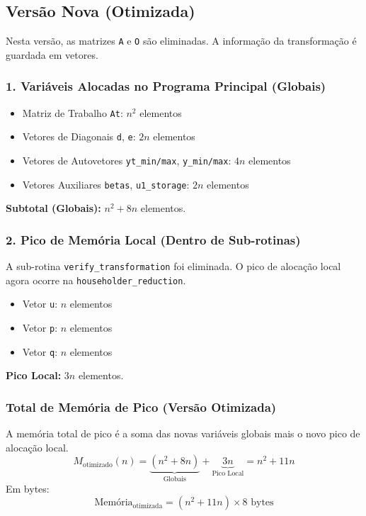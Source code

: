\documentclass[12pt, a4paper]{article} %
\begin{document}
            \subsection*{Vers\~ao Nova (Otimizada)}

            Nesta vers\~ao, as matrizes \texttt{A} e \texttt{O} s\~ao eliminadas. A informa\c{c}\~ao da transforma\c{c}\~ao \'e guardada em vetores.

            \subsubsection*{1. Vari\'aveis Alocadas no Programa Principal (Globais)}
            \begin{itemize}
                \item Matriz de Trabalho \texttt{At}: $n^2$ elementos
                \item Vetores de Diagonais \texttt{d}, \texttt{e}: $2n$ elementos
                \item Vetores de Autovetores \texttt{yt\_min/max}, \texttt{y\_min/max}: $4n$ elementos
                \item Vetores Auxiliares \texttt{betas}, \texttt{u1\_storage}: $2n$ elementos
            \end{itemize}
            \textbf{Subtotal (Globais):} $n^2 + 8n$ elementos.

            \subsubsection*{2. Pico de Mem\'oria Local (Dentro de Sub-rotinas)}
            A sub-rotina \texttt{verify\_transformation} foi eliminada. O pico de aloca\c{c}\~ao local agora ocorre na \texttt{householder\_reduction}.
            \begin{itemize}
                \item Vetor \texttt{u}: $n$ elementos
                \item Vetor \texttt{p}: $n$ elementos
                \item Vetor \texttt{q}: $n$ elementos
            \end{itemize}
            \textbf{Pico Local:} $3n$ elementos.

            \subsubsection*{Total de Mem\'oria de Pico (Vers\~ao Otimizada)}
            A mem\'oria total de pico \'e a soma das novas vari\'aveis globais mais o novo pico de aloca\c{c}\~ao local.
            \[
            M_{\text{otimizado}}(n) = \underbrace{(n^2 + 8n)}_{\text{Globais}} + \underbrace{3n}_{\text{Pico Local}} = n^2 + 11n
            \]
            Em bytes:
            \[
            \text{Mem\'oria}_{\text{otimizada}} = (n^2 + 11n) \times 8 \text{ bytes}
            \]
\end{document}
